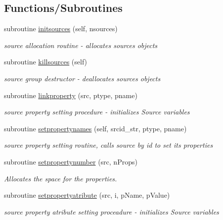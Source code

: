 \subsection*{Functions/\+Subroutines}
\begin{DoxyCompactItemize}
\item 
subroutine \mbox{\hyperlink{namespacesources__mod_a6da3303e5c39d77c0111ec50623bf5fe}{initsources}} (self, nsources)
\begin{DoxyCompactList}\small\item\em source allocation routine -\/ allocates sources objects \end{DoxyCompactList}\item 
subroutine \mbox{\hyperlink{namespacesources__mod_aee745aa084adcfa41ecfc3469b90aa8e}{killsources}} (self)
\begin{DoxyCompactList}\small\item\em source group destructor -\/ deallocates sources objects \end{DoxyCompactList}\item 
subroutine \mbox{\hyperlink{namespacesources__mod_a683ca7e4aca7a0050aad9f506569fca9}{linkproperty}} (src, ptype, pname)
\begin{DoxyCompactList}\small\item\em source property setting procedure -\/ initializes Source variables \end{DoxyCompactList}\item 
subroutine \mbox{\hyperlink{namespacesources__mod_aa76f16f8ee96bc86b553aa54d420321c}{setpropertynames}} (self, srcid\+\_\+str, ptype, pname)
\begin{DoxyCompactList}\small\item\em source property setting routine, calls source by id to set its properties \end{DoxyCompactList}\item 
subroutine \mbox{\hyperlink{namespacesources__mod_a9c2faf82364c7af60abc1ec25b23c7b5}{setpropertynumber}} (src, n\+Props)
\begin{DoxyCompactList}\small\item\em Allocates the space for the properties. \end{DoxyCompactList}\item 
subroutine \mbox{\hyperlink{namespacesources__mod_a2b7d1a3856735fdb0fb4ff142e38668d}{setpropertyatribute}} (src, i, p\+Name, p\+Value)
\begin{DoxyCompactList}\small\item\em source property atribute setting proceadure -\/ initializes Source variables \end{DoxyCompactList}\item 

\end{DoxyCompactItemize}
